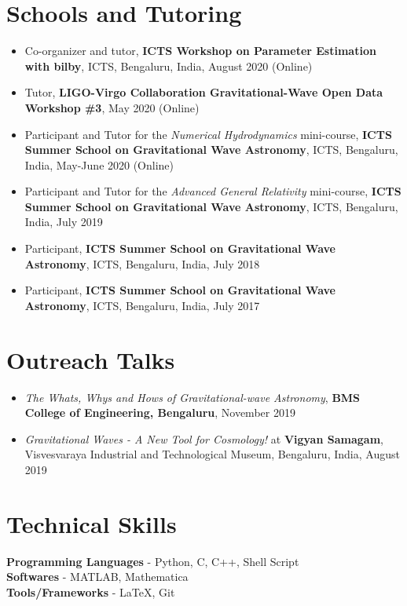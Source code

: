 \documentclass[margin, centered]{res}
\begin{document}
\begin{resume}
\section{Schools and Tutoring}
\begin{itemize}[leftmargin=*]
	\item Co-organizer and tutor, \textbf{ICTS Workshop on Parameter Estimation with bilby}, ICTS, Bengaluru, India, August 2020 (Online)
	\item Tutor, \textbf{LIGO-Virgo Collaboration Gravitational-Wave Open Data Workshop \#3}, May 2020 (Online)
	\item Participant and Tutor for the \textit{Numerical Hydrodynamics} mini-course, \textbf{ICTS Summer School on Gravitational Wave Astronomy}, ICTS, Bengaluru, India, May-June 2020 (Online)
	\item Participant and Tutor for the \textit{Advanced General Relativity} mini-course, \textbf{ICTS Summer School on Gravitational Wave Astronomy}, ICTS, Bengaluru, India, July 2019
	\item Participant, \textbf{ICTS Summer School on Gravitational Wave Astronomy}, ICTS, Bengaluru, India, July 2018
	\item Participant, \textbf{ICTS Summer School on Gravitational Wave Astronomy}, ICTS, Bengaluru, India, July 2017
\end{itemize}
\section{Outreach Talks}
\begin{itemize}[leftmargin=*]
	\item  \textit{The Whats, Whys and Hows of Gravitational-wave Astronomy}, \textbf{BMS College of Engineering, Bengaluru}, November 2019
	\item \textit{Gravitational Waves - A New Tool for Cosmology!} at \textbf{Vigyan Samagam}, Visvesvaraya Industrial and Technological Museum, Bengaluru, India, August 2019

\end{itemize}




\section{Technical \hspace{2mm} Skills}
\textbf{Programming Languages} - Python, C, C++, Shell Script\\
\textbf{Softwares} - MATLAB, Mathematica \\
\textbf{Tools/Frameworks} - \LaTeX, Git




\end{resume}
\end{document}
